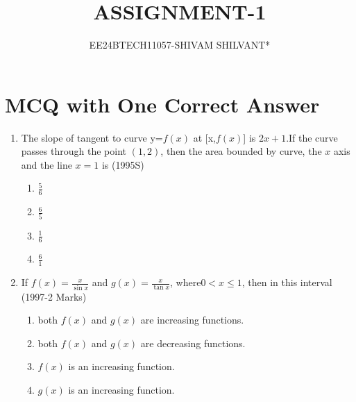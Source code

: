 \documentclass[journal,12pt,twocolumn]{IEEEtran}
\theoremstyle{remark}
\begin{document}

\vspace{3cm}

\title{ASSIGNMENT-1}
\author{EE24BTECH11057-SHIVAM SHILVANT*}
\maketitle
\newpage
\bigskip

\renewcommand{\thefigure}{\theenumi}
\renewcommand{\thetable}{\theenumi}
\section{MCQ with One Correct Answer}
\begin{enumerate}
\item The slope of tangent to curve y=$f(x)$ at [x,$f(x)$] is $2x + 1$.If the curve passes through the point $(1,2)$, then the area bounded by curve, the $x$ axis and the line $x=1$ is
\hfill {(1995S) }
\begin{enumerate}
    \item $\displaystyle\frac{5}{6}$\\ 
    \item $\displaystyle\frac{6}{5}$\\
    \item $\displaystyle\frac{1}{6}$\\ 
    \item $\displaystyle\frac{6}{1}$\\
\end{enumerate}
\item If $f(x)=\displaystyle\frac{x}{\sin x}$ and $g(x)=\displaystyle\frac{x}{\tan x}$, where$0<x\leq1$, then in this interval
\hfill (1997-2 Marks)
\begin{enumerate}
    \item both $f(x)$ and $g(x)$ are increasing functions.
\item both $f(x)$ and $g(x)$ are decreasing functions.
    \item $f(x)$ is an increasing function.
    \item $g(x)$ is an increasing function.\\
\end{enumerate}


\end{enumerate}
\end{document}
